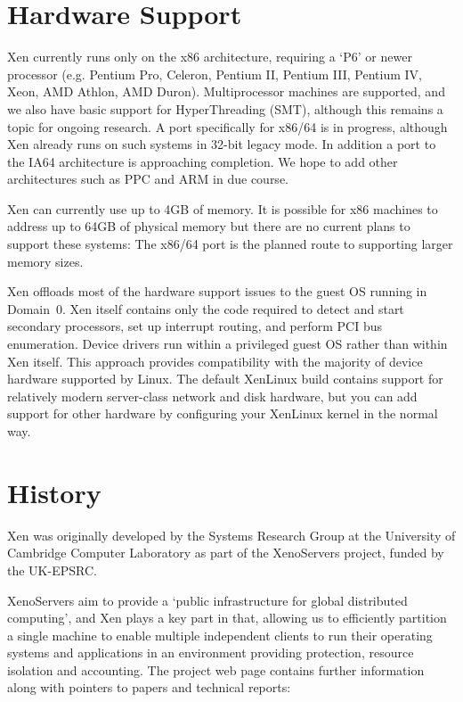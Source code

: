 \section{Hardware Support}

Xen currently runs only on the x86 architecture, requiring a `P6' or
newer processor (e.g. Pentium Pro, Celeron, Pentium II, Pentium III,
Pentium IV, Xeon, AMD Athlon, AMD Duron).  Multiprocessor machines are
supported, and we also have basic support for HyperThreading (SMT),
although this remains a topic for ongoing research. A port
specifically for x86/64 is in progress, although Xen already runs on
such systems in 32-bit legacy mode. In addition a port to the IA64
architecture is approaching completion. We hope to add other
architectures such as PPC and ARM in due course.

Xen can currently use up to 4GB of memory.  It is possible for x86
machines to address up to 64GB of physical memory but there are no
current plans to support these systems: The x86/64 port is the planned
route to supporting larger memory sizes.

Xen offloads most of the hardware support issues to the guest OS
running in Domain~0.  Xen itself contains only the code required to
detect and start secondary processors, set up interrupt routing, and
perform PCI bus enumeration.  Device drivers run within a privileged
guest OS rather than within Xen itself. This approach provides
compatibility with the majority of device hardware supported by Linux.
The default XenLinux build contains support for relatively modern
server-class network and disk hardware, but you can add support for
other hardware by configuring your XenLinux kernel in the normal way.


\section{History}

Xen was originally developed by the Systems Research Group at the
University of Cambridge Computer Laboratory as part of the XenoServers
project, funded by the UK-EPSRC.

XenoServers aim to provide a `public infrastructure for global
distributed computing', and Xen plays a key part in that, allowing us
to efficiently partition a single machine to enable multiple
independent clients to run their operating systems and applications in
an environment providing protection, resource isolation and
accounting.  The project web page contains further information along
with pointers to papers and technical reports:

